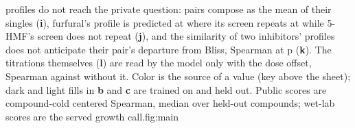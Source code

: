 {profiles do not reach the private question: pairs compose as the mean of their singles
(\textbf{i}), furfural's profile is predicted at \hydprofFfRidge{} where its screen
repeats at \hydprofFfReliability{} while 5-HMF's screen does not repeat (\textbf{j}), and
the similarity of two inhibitors' profiles does not anticipate their pair's departure from
Bliss, Spearman \hydsvdBestSpearman{} at p \hydsvdBestP{} (\textbf{k}). The titrations
themselves (\textbf{l}) are read by the model only with the dose offset, Spearman
\hydexTwoOneDoseSpearman{} against \hydexTwoOneFittedSpearman{} without it. Color is the
source of a value (key above the sheet); dark and light fills in \textbf{b} and \textbf{c}
are trained on and held out. Public scores are compound-cold centered Spearman, median over
held-out compounds; wet-lab scores are the served growth call.}{fig:main}
\clearpage

